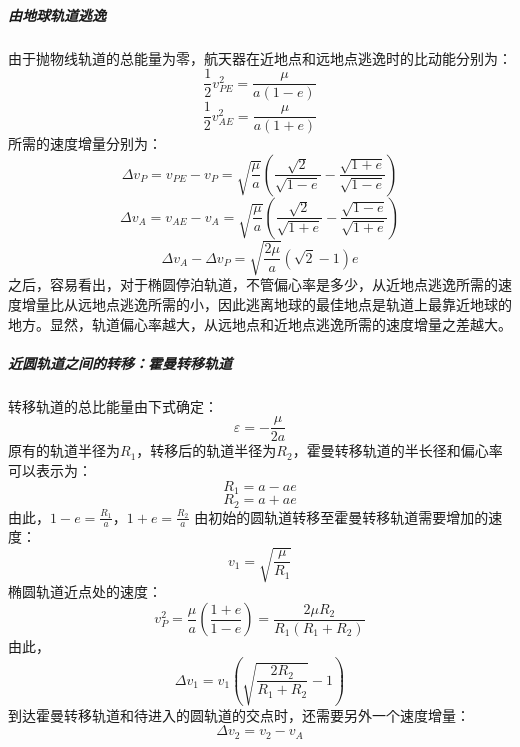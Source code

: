 \subparagraph{由地球轨道逃逸}
由于抛物线轨道的总能量为零，航天器在近地点和远地点逃逸时的比动能分别为：
\begin{equation}
	\frac{1}{2}v_{PE}^2=\frac{\mu}{a(1-e)}
\end{equation}
\begin{equation}
	\frac{1}{2}v_{AE}^2=\frac{\mu}{a(1+e)}
\end{equation}
所需的速度增量分别为：
\begin{equation}
	\Delta v_{P}=v_{PE}-v_{P}=\sqrt{\frac{\mu}{a}}\left(\frac{\sqrt{2}}{\sqrt{1-e}}-\frac{\sqrt{1+e}}{\sqrt{1-e}}\right)
\end{equation}
\begin{equation}
	\Delta v_{A}=v_{AE}-v_{A}=\sqrt{\frac{\mu}{a}}\left(\frac{\sqrt{2}}{\sqrt{1+e}}-\frac{\sqrt{1-e}}{\sqrt{1+e}}\right)
\end{equation}
\begin{equation}
	\Delta v_{A}-\Delta v_{P}=\sqrt{\frac{2\mu}{a}}(\sqrt{2}-1)e
\end{equation}
之后，容易看出，对于椭圆停泊轨道，不管偏心率是多少，从近地点逃逸所需的速度增量比从远地点逃逸所需的小，因此逃离地球的最佳地点是轨道上最靠近地球的地方。显然，轨道偏心率越大，从远地点和近地点逃逸所需的速度增量之差越大。
\subparagraph{近圆轨道之间的转移：霍曼转移轨道}
转移轨道的总比能量由下式确定：
\begin{equation}
	\varepsilon=-\frac{\mu}{2a}
\end{equation}
原有的轨道半径为$R_{1}$，转移后的轨道半径为$R_{2}$，霍曼转移轨道的半长径和偏心率可以表示为：
\begin{equation}
	R_{1}=a-ae
\end{equation}
\begin{equation}
	R_{2}=a+ae
\end{equation}
由此，$1-e=\frac{R_1}{a}$，$1+e=\frac{R_{2}}{a}$
由初始的圆轨道转移至霍曼转移轨道需要增加的速度：
\begin{equation}
	v_{1}=\sqrt{\frac{\mu}{R_{1}}}
\end{equation}
椭圆轨道近点处的速度：
\begin{equation}
	v_{P}^2=\frac{\mu}{a}\left(\frac{1+e}{1-e}\right)=\frac{2\mu R_{2}}{R_{1}(R_{1}+R_{2})}
\end{equation}
由此，
\begin{equation}
	\Delta v_{1}=v_{1}\left(\sqrt{\frac{2R_{2}}{R_{1}+R_{2}}}-1\right)
\end{equation}
到达霍曼转移轨道和待进入的圆轨道的交点时，还需要另外一个速度增量：
\begin{equation}
	\Delta v_{2}=v_{2}-v_{A}
\end{equation}
